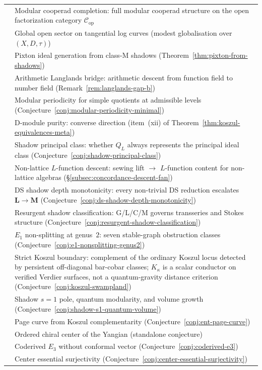 \begin{center}
\begin{tabular}{cp{10.5cm}}
& Modular cooperad completion:
 full modular cooperad structure on the open
 factorization category
 $\mathcal{C}_{\mathrm{op}}$ \\
& Global open sector on tangential log curves
 \textup{(}modest globalisation over $(X,D,\tau)$\textup{)} \\
& Pixton ideal generation from class-M shadows
 \textup{(}Theorem~\ref{thm:pixton-from-shadows}\textup{)} \\
& Arithmetic Langlands bridge:
 arithmetic descent from function field to
 number field
 \textup{(}Remark~\ref{rem:langlands-gap-b}\textup{)} \\
& Modular periodicity for simple quotients at
 admissible levels
 \textup{(}Conjecture~\ref{conj:modular-periodicity-minimal}\textup{)} \\
& D-module purity: converse direction
 \textup{(}item~(xii) of
 Theorem~\ref{thm:koszul-equivalences-meta}\textup{)} \\
& Shadow principal class: whether $Q_L$ always
 represents the principal ideal class
 \textup{(}Conjecture~\ref{conj:shadow-principal-class}\textup{)} \\
& Non-lattice $L$-function descent:
 sewing lift $\to$ $L$-function content for
 non-lattice algebras
 \textup{(}\S\ref{subsec:concordance-descent-fan}\textup{)} \\
& DS shadow depth monotonicity:
 every non-trivial DS reduction escalates
 $\mathbf{L} \to \mathbf{M}$
 \textup{(}Conjecture~\ref{conj:ds-shadow-depth-monotonicity}\textup{)} \\
& Resurgent shadow classification:
 G/L/C/M governs transseries and Stokes structure
 \textup{(}Conjecture~\ref{conj:resurgent-shadow-classification}\textup{)} \\
& $E_1$ non-splitting at genus~$2$:
 seven stable-graph obstruction classes
 \textup{(}Conjecture~\ref{conj:e1-nonsplitting-genus2}\textup{)} \\
& Strict Koszul boundary:
 complement of the ordinary Koszul locus detected by
 persistent off-diagonal bar-cobar classes; $K_\kappa$ is a
 scalar conductor on verified Verdier surfaces, not a
 quantum-gravity distance criterion
 \textup{(}Conjecture~\ref{conj:koszul-swampland}\textup{)} \\
& Shadow $s{=}1$ pole, quantum modularity,
 and volume growth
 \textup{(}Conjecture~\ref{conj:shadow-s1-quantum-volume}\textup{)} \\
& Page curve from Koszul complementarity
 \textup{(}Conjecture~\ref{conj:ent-page-curve}\textup{)} \\
& Ordered chiral center of the Yangian
 \textup{(}standalone conjecture\textup{)} \\
& Coderived $E_3$ without conformal vector
 \textup{(}Conjecture~\ref{conj:coderived-e3}\textup{)} \\
& Center essential surjectivity
 \textup{(}Conjecture~\ref{conj:center-essential-surjectivity}\textup{)}
\end{tabular}
\end{center}

